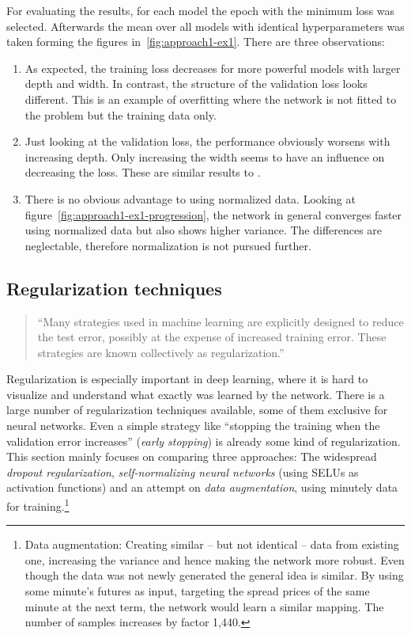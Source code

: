 For evaluating the results, for each model the epoch with the minimum loss was selected. Afterwards the mean over all models with identical hyperparameters was taken forming the figures in~\ref{fig:approach1-ex1}. There are three observations:

\begin{enumerate}
	\item As expected, the training loss decreases for more powerful models with larger depth and width. In contrast, the structure of the validation loss looks different. This is an example of overfitting where the network is not fitted to the problem but the training data only.
	\item Just looking at the validation loss, the performance obviously worsens with increasing depth. Only increasing the width seems to have an influence on decreasing the loss. These are similar results to \cite{Niaki-2013}.
	\item There is no obvious advantage to using normalized data. Looking at figure~\ref{fig:approach1-ex1-progression}, the network in general converges faster using normalized data but also shows higher variance. The differences are neglectable, therefore normalization is not pursued further.
\end{enumerate}


\subsection{Regularization techniques}

\begin{quote}
	``Many strategies	used in machine learning are explicitly designed to reduce the test error, possibly at the expense of increased training error. These strategies are known collectively as regularization.''\cite[p.\,228]{Goodfellow-et-al-2016}
\end{quote}

Regularization is especially important in deep learning, where it is hard to visualize and understand what exactly was learned by the network. There is a large number of regularization techniques available, some of them exclusive for neural networks. Even a simple strategy like ``stopping the training when the validation error increases'' (\emph{early stopping}) is already some kind of regularization. This section mainly focuses on comparing three approaches: The widespread \emph{dropout regularization}, \emph{self-normalizing neural networks} (using SELUs as activation functions) and an attempt on \emph{data augmentation}, using minutely data for training.\footnote{%
	Data augmentation: Creating similar -- but not identical -- data from existing one, increasing the variance and hence making the network more robust. Even though the data was not newly generated the general idea is similar. By using some minute's futures as input, targeting the spread prices of the same minute at the next term, the network would learn a similar mapping. The number of samples increases by factor 1,440.}

